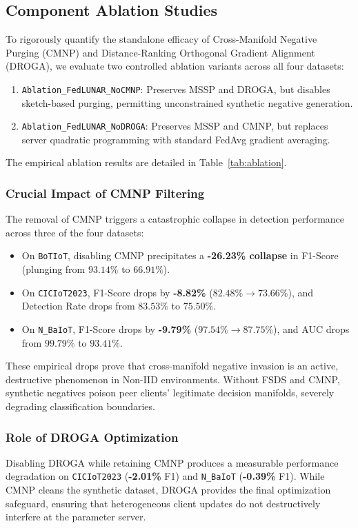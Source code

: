 \subsection{Component Ablation Studies}
\label{subsec:ablation}

To rigorously quantify the standalone efficacy of Cross-Manifold Negative Purging (CMNP) and Distance-Ranking Orthogonal Gradient Alignment (DROGA), we evaluate two controlled ablation variants across all four datasets:
\begin{enumerate}
    \item \texttt{Ablation\_FedLUNAR\_NoCMNP}: Preserves MSSP and DROGA, but disables sketch-based purging, permitting unconstrained synthetic negative generation.
    \item \texttt{Ablation\_FedLUNAR\_NoDROGA}: Preserves MSSP and CMNP, but replaces server quadratic programming with standard FedAvg gradient averaging.
\end{enumerate}

The empirical ablation results are detailed in Table~\ref{tab:ablation}.

\subsubsection{Crucial Impact of CMNP Filtering}
The removal of CMNP triggers a catastrophic collapse in detection performance across three of the four datasets:
\begin{itemize}
    \item On \texttt{BoTIoT}, disabling CMNP precipitates a \textbf{-26.23\% collapse} in F1-Score (plunging from $93.14\%$ to $66.91\%$).
    \item On \texttt{CICIoT2023}, F1-Score drops by \textbf{-8.82\%} ($82.48\% \to 73.66\%$), and Detection Rate drops from $83.53\%$ to $75.50\%$.
    \item On \texttt{N\_BaIoT}, F1-Score drops by \textbf{-9.79\%} ($97.54\% \to 87.75\%$), and AUC drops from $99.79\%$ to $93.41\%$.
\end{itemize}
These empirical drops prove that cross-manifold negative invasion is an active, destructive phenomenon in Non-IID environments. Without FSDS and CMNP, synthetic negatives poison peer clients' legitimate decision manifolds, severely degrading classification boundaries.

\subsubsection{Role of DROGA Optimization}
Disabling DROGA while retaining CMNP produces a measurable performance degradation on \texttt{CICIoT2023} (\textbf{-2.01\%} F1) and \texttt{N\_BaIoT} (\textbf{-0.39\%} F1). While CMNP cleans the synthetic dataset, DROGA provides the final optimization safeguard, ensuring that heterogeneous client updates do not destructively interfere at the parameter server.

